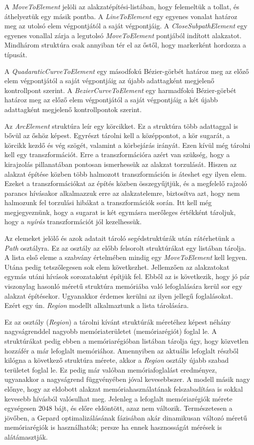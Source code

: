 \documentclass[12pt]{report}
\theoremstyle{definition}
\newcommand{\func}[1]{{\textsl{#1}}}
\begin{document}
A \func{MoveToElement} jelöli az alakzatépítési-listában, hogy felemeltük a
tollat, és áthelyeztük egy másik pontba. A \func{LineToElement} egy egyenes
vonalat határoz meg az utolsó elem végpontjától a saját végpontjáig. A
\func{CloseSubpathElement} egy egyenes vonallal zárja a legutolsó
\func{MoveToElement} pontjából indított alakzatot. Mindhárom struktúra csak
annyiban tér el az őstől, hogy markerként hordozza a típusát.

A \func{QuadaraticCurveToElement} egy másodfokú Bézier-görbét határoz meg az
előző elem végpontjától a saját végpontjáig az újabb adattagként megjelenő
kontrollpont szerint. A \func{BezierCurveToElement} egy harmadfokú
Bézier-görbét határoz meg az előző elem végpontjától a saját végpontjáig a két
újabb adattagként megjelenő kontrollpontok szerint.

Az \func{ArcElement} struktúra leír egy körcikket. Ez a struktúra több
adattaggal is bővül az őshöz képest. Egyrészt tárolni kell a középpontot, a kör
sugarát, a körcikk kezdő és vég szögét, valamint a körbejárás irányát. Ezen
kívül még tárolni kell egy transzformációt. Erre a transzformációra azért van
szükség, hogy a kirajzolás pillanatában pontosan ismerhessük az alakzat
torzulását. Hiszen az alakzat építése közben több halmozott transzformáción is
áteshet egy ilyen elem. Ezeket a transzformációkat az építés közben
összegyűjtjük, és a megfelelő rajzoló parancs hívásakor alkalmazzuk erre az
alakzatelemre, biztosítva azt, hogy nem halmozunk fel torzulási hibákat a
transzformációk során. Itt kell még megjegyeznünk, hogy a sugarat is két
egymásra merőleges értékként tároljuk, hogy a \emph{nyírás} transzformációt jól
kezelhessük.

Az elemeket jelölő és azok adatait tároló segédstruktúrák után rátérhetünk a
\func{Path} osztályra. Ez az osztály az előbb felsorolt struktúrákat egy
listában tárolja. A lista első eleme a szabvány értelmében mindig egy
\func{MoveToElement} kell legyen. Utána pedig tetszőlegesen sok elem
következhet. Jellemzően az alakzatokat egymás utáni hívások sorozataként
építjük fel. Ebből az is következik, hogy jó pár viszonylag hasonló méretű
struktúra memóriába való lefoglalására kerül sor egy alakzat építésekor.
Ugyanakkor érdemes kerülni az ilyen jellegű foglalásokat. Ezért egy ún.
\emph{Region} modellt alkalmaztunk a lista tárolására.

Ez az osztály (\func{Region}) a tárolni kívánt struktúrák méretéhez képest
néhány nagyságrenddel nagyobb memóriaterületet (memóriarégiót) foglal le. A
struktúrákat pedig ebben a memóriarégióban listában tárolja úgy, hogy közvetlen
hozzáfér a már lefoglalt memóriához. Amennyiben az aktuális lefoglalt részből
kilógna a következő struktúra mérete, akkor a \func{Region} osztály újabb
szabad területet foglal le. Ez pedig már valóban memóriafoglalást eredményez,
ugyanakkor a nagyságrend függvényében jóval kevesebbszer. A modell másik nagy
előnye, hogy az eldobott alakzat memóriahasználatának felszabadítása is sokkal
kevesebb hívásból valósulhat meg. Jelenleg a lefoglalt memóriarégiók mérete
egységesen 2048 bájt, és előre eldöntött, azaz nem változik. Természetesen a
jövőben, a Gepard optimalizálásának fázisában akár dinamikusan változó méretű
memóriarégiók is használhatók; persze ha ennek hasznosságát mérések is
alátámasztják.
\end{document}
